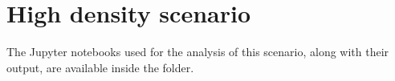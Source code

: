 \section{High density scenario}\label{sec:high-density}

The Jupyter notebooks used for the analysis of this scenario, along with their
output, are available inside the  folder.


